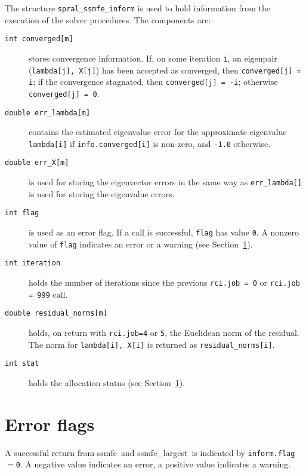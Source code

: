 The structure {\tt spral\_ssmfe\_inform} is used
to hold information from the execution of
the solver procedures.
The components are:

\begin{description}
%
\item[\texttt{int converged[m]}] stores convergence information.
If, on some iteration {\tt i}, an eigenpair ({\tt lambda[j], X[j]})
has been accepted as converged, then {\tt converged[j] = i}; 
if the convergence stagnated, then {\tt converged[j] = -i}; 
otherwise {\tt converged[j] = 0}.
%
\item[\texttt{double err\_lambda[m]}] contains 
the estimated eigenvalue error
for the approximate eigenvalue {\tt lambda[i]}
if {\tt info.converged[i]} is non-zero,
and {\tt -1.0} otherwise.
%
\item[\texttt{double err\_X[m]}] is used for storing the eigenvector errors
in the same way as {\tt err\_lambda[]} is used
for storing the eigenvalue errors.
%
\item[\texttt{int flag}] is used as an error flag.
If a call is successful, {\tt flag} has value {\tt 0}.
A nonzero value of {\tt flag} indicates an error or a warning
(see Section~\ref{ssmfe_core:errors}).
%
\item[\texttt{int iteration}] holds the number of iterations 
since the previous {\tt rci.job = 0} or {\tt rci.job = 999} call.
%
\item[\texttt{double residual\_norms[m]}] holds, on return with
{\tt rci.job=4} or {\tt 5}, 
the Euclidean norm of the residual. The norm
for {\tt lambda[i], X[i]} is returned as \texttt{residual\_norms[i]}.
%
\item[\texttt{int stat}]
holds the allocation status
(see Section~\ref{ssmfe_core:errors}).
%
\end{description}

\section{Error flags}

\label{ssmfe_core:errors}

A successful return from 
ssmfe\ and
ssmfe\_largest\
is indicated 
by {\tt inform.flag$=$0}.
A negative value indicates an error, a positive value indicates a warning.

